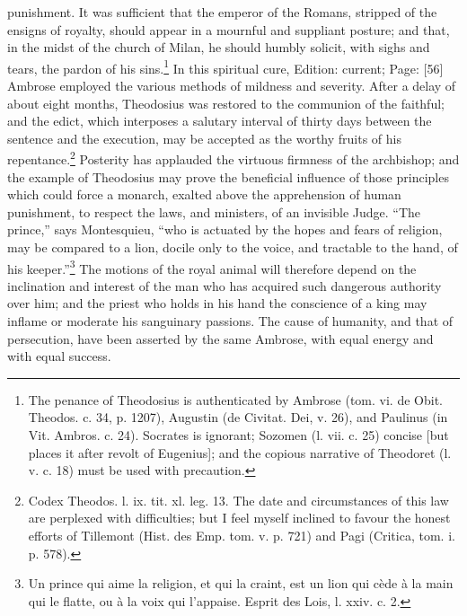 punishment. It was sufficient that the emperor of the Romans, stripped of the ensigns of royalty, should appear in a mournful and suppliant posture; and that, in the midst of the church of Milan, he should humbly solicit, with sighs and tears, the pardon of his sins.\footnote{The penance of Theodosius is authenticated by Ambrose (tom. vi. de Obit. Theodos. c. 34, p. 1207), Augustin (de Civitat. Dei, v. 26), and Paulinus (in Vit. Ambros. c. 24). Socrates is ignorant; Sozomen (l. vii. c. 25) concise [but places it after revolt of Eugenius]; and the copious narrative of Theodoret (l. v. c. 18) must be used with precaution.} In this spiritual cure, Edition: current; Page: [56] Ambrose employed the various methods of mildness and severity. After a delay of about eight months, Theodosius was restored to the communion of the faithful; and the edict, which interposes a salutary interval of thirty days between the sentence and the execution, may be accepted as the worthy fruits of his repentance.\footnote{Codex Theodos. l. ix. tit. xl. leg. 13. The date and circumstances of this law are perplexed with difficulties; but I feel myself inclined to favour the honest efforts of Tillemont (Hist. des Emp. tom. v. p. 721) and Pagi (Critica, tom. i. p. 578).} Posterity has applauded the virtuous firmness of the archbishop; and the example of Theodosius may prove the beneficial influence of those principles which could force a monarch, exalted above the apprehension of human punishment, to respect the laws, and ministers, of an invisible Judge. \texthebrew{“}The prince,\texthebrew{}” says Montesquieu, \texthebrew{“}who is actuated by the hopes and fears of religion, may be compared to a lion, docile only to the voice, and tractable to the hand, of his keeper.\texthebrew{}”\footnote{Un prince qui aime la religion, et qui la craint, est un lion qui cède à la main qui le flatte, ou à la voix qui l\texthebrew{}’appaise. Esprit des Lois, l. xxiv. c. 2.} The motions of the royal animal will therefore depend on the inclination and interest of the man who has acquired such dangerous authority over him; and the priest who holds in his hand the conscience of a king may inflame or moderate his sanguinary passions. The cause of humanity, and that of persecution, have been asserted by the same Ambrose, with equal energy and with equal success.

